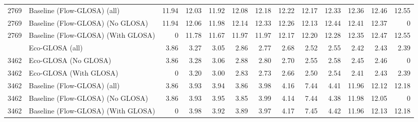 \begin{table}[ht]
{\begin{tabular}{llrrrrrrrrrrr}
        2769 & Baseline (Flow-GLOSA) (all)        & 11.94 & 12.03 & 11.92 & 12.08 & 12.18 & 12.22 & 12.17 & 12.33 & 12.36 & 12.46 & 12.55 \\
        2769 & Baseline (Flow-GLOSA) (No GLOSA)   & 11.94 & 12.06 & 11.98 & 12.14 & 12.33 & 12.26 & 12.13 & 12.44 & 12.41 & 12.37 & 0     \\
        2769 & Baseline (Flow-GLOSA) (With GLOSA) & 0     & 11.78 & 11.67 & 11.97 & 11.97 & 12.17 & 12.20 & 12.28 & 12.35 & 12.47 & 12.55 \\
        \addlinespace
        3462 & Eco-GLOSA (all)                    & 3.86  & 3.27  & 3.05  & 2.86  & 2.77  & 2.68  & 2.52  & 2.55  & 2.42  & 2.43  & 2.39  \\
        3462 & Eco-GLOSA (No GLOSA)               & 3.86  & 3.28  & 3.06  & 2.88  & 2.80  & 2.70  & 2.55  & 2.58  & 2.45  & 2.46  & 0     \\
        3462 & Eco-GLOSA (With GLOSA)             & 0     & 3.20  & 3.00  & 2.83  & 2.73  & 2.66  & 2.50  & 2.54  & 2.41  & 2.43  & 2.39  \\
        3462 & Baseline (Flow-GLOSA) (all)        & 3.86  & 3.93  & 3.94  & 3.86  & 3.98  & 4.16  & 7.44  & 4.41  & 11.96 & 12.12 & 12.18 \\
        3462 & Baseline (Flow-GLOSA) (No GLOSA)   & 3.86  & 3.93  & 3.95  & 3.85  & 3.99  & 4.14  & 7.44  & 4.38  & 11.98 & 12.05 & 0     \\
        3462 & Baseline (Flow-GLOSA) (With GLOSA) & 0     & 3.98  & 3.92  & 3.89  & 3.97  & 4.17  & 7.45  & 4.42  & 11.96 & 12.13 & 12.18 \\
        \bottomrule
      \end{tabular}
    }
\end{table}

